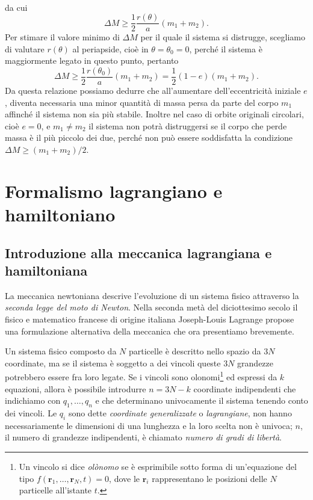 {\begin{equation}
\begin{split}
  \end{split}
\end{equation}
da cui
\begin{equation}
  \Delta M \geq \frac{1}{2}\frac{r(\theta)}{a}(m_1 + m_2).
\end{equation}
Per stimare il valore minimo di $\Delta M$ per il quale il sistema si distrugge,
scegliamo di valutare $r(\theta)$ al periapside, cioè in $\theta = \theta_0 =
0$, perché il sistema è maggiormente legato in questo punto, pertanto
\begin{equation}
    \Delta M \geq \frac{1}{2}\frac{r(\theta_0)}{a}(m_1 + m_2) =
    \frac{1}{2}(1 - e)(m_1 + m_2).
\end{equation}
Da questa relazione possiamo dedurre che all'aumentare dell'eccentricità
iniziale $e$, diventa necessaria una minor quantità di massa persa da parte del
corpo $m_1$ affinché il sistema non sia più stabile. Inoltre nel caso di orbite
originali circolari, cioè $e=0$, e $m_1 \neq m_2$ il sistema non potrà
distruggersi se il corpo che perde massa è il più piccolo dei due, perché non
può essere soddisfatta la condizione $\Delta M \geq (m_1 + m_2)/2$.

\section{Formalismo lagrangiano e hamiltoniano}
\label{sec:formalismo-lagrange}

\subsection{Introduzione alla meccanica lagrangiana e hamiltoniana}
\label{sec:intro-lagrange}

La meccanica newtoniana descrive l'evoluzione di un sistema fisico attraverso la
\emph{seconda legge del moto di Newton}. Nella seconda metà del diciottesimo
secolo il fisico e matematico francese di origine italiana Joseph-Louis Lagrange
propose una formulazione alternativa della meccanica che ora presentiamo
brevemente.

Un sistema fisico composto da $N$ particelle è descritto nello spazio da $3N$
coordinate, ma se il sistema è soggetto a dei vincoli queste $3N$ grandezze
potrebbero essere fra loro legate. Se i vincoli sono olonomi\footnote{Un vincolo
  si dice \emph{olònomo} se è esprimibile sotto forma di un'equazione del tipo
  $f(\bm{r}_1,\dots,\bm{r}_N,t)=0$, dove le $\bm{r}_i$ rappresentano le
  posizioni delle $N$ particelle all'istante $t$.} ed espressi da $k$ equazioni,
allora è possibile introdurre $n=3N-k$ coordinate indipendenti che indichiamo
con $q_1,\dots,q_n$ e che determinano univocamente il sistema tenendo conto dei
vincoli. Le $q_i$ sono dette \emph{coordinate generalizzate} o
\emph{lagrangiane}, non hanno necessariamente le dimensioni di una lunghezza e
la loro scelta non è univoca; $n$, il numero di grandezze indipendenti, è
chiamato \emph{numero di gradi di libertà}.

}
